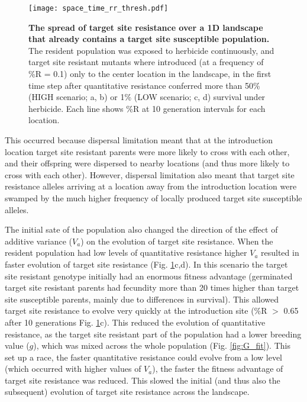 \documentclass[10pt,letterpaper]{article}
\begin{document}
\begin{figure}[!h] 
\texttt{[image: space\_time\_rr\_thresh.pdf]} 
\caption{{\bf The spread of target site resistance over a 1D landscape that already contains a target site susceptible population.} The resident population was exposed to herbicide continuously, and target site resistant mutants where introduced (at a frequency of \%R = 0.1) only to the center location in the landscape, in the first time step after quantitative resistance conferred more than 50\% (HIGH scenario; a, b) or 1\% (LOW scenario; c, d) survival under herbicide. Each line shows \%R at 10 generation intervals for each location.} 
\label{fig_spread}
\end{figure}

This occurred because dispersal limitation meant that at the introduction location target site resistant parents were more likely to cross with each other, and their offspring were dispersed to nearby locations (and thus more likely to cross with each other). However, dispersal limitation also meant that target site resistance alleles arriving at a location away from the introduction location were swamped by the much higher frequency of locally produced target site susceptible alleles.

The initial sate of the population also changed the direction of the effect of additive variance ($V_a$) on the evolution of target site resistance. When the resident population had low levels of quantitative resistance higher $V_a$ resulted in faster evolution of target site resistance (Fig. \ref{fig_spread}c,d). In this scenario the target site resistant genotype initially had an enormous fitness advantage (germinated target site resistant parents had fecundity more than 20 times higher than target site susceptible parents, mainly due to differences in survival). This allowed target site resistance to evolve very quickly at the introduction site (\%R $>$ 0.65 after 10 generations Fig. \ref{fig_spread}c). This reduced the evolution of quantitative resistance, as the target site resistant part of the population had a lower breeding value ($g$), which was mixed across the whole population (Fig. \ref{fig:G_fit}). This set up a race, the faster quantitative resistance could evolve from a low level (which occurred with higher values of $V_a$), the faster the fitness advantage of target site resistance was reduced. This slowed the initial (and thus also the subsequent) evolution of target site resistance across the landscape.             
\end{document}
